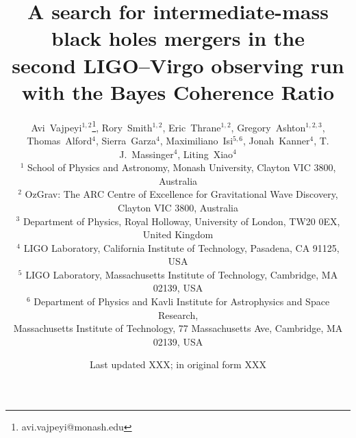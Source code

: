 \newcommand{\SPA}{School of Physics and Astronomy, Monash University, Clayton VIC 3800, Australia}
\newcommand{\OzGravMonash}{OzGrav: The ARC Centre of Excellence for Gravitational Wave Discovery, Clayton VIC 3800, Australia}
\newcommand{\CIT}{LIGO Laboratory, California Institute of Technology, Pasadena, CA 91125, USA}
\newcommand{\MIT}{LIGO Laboratory, Massachusetts Institute of Technology, Cambridge, MA 02139, USA}
\newcommand{\Kavli}{Department of Physics and Kavli Institute for Astrophysics and Space Research,\\ Massachusetts Institute of Technology, 77 Massachusetts Ave, Cambridge, MA 02139, USA}
\newcommand{\Royal}{Department of Physics, Royal Holloway, University of London, TW20 0EX, United Kingdom}





\title[An IMBH search in O2 using the BCR]{A search for intermediate-mass black holes mergers in the \\second LIGO--Virgo observing run with the Bayes Coherence Ratio}



\author[Vajpeyi et al.]{Avi~Vajpeyi$^{1,2}$\thanks{avi.vajpeyi@monash.edu},
    Rory~Smith$^{1,2}$,
    Eric~Thrane$^{1,2}$,
    Gregory~Ashton$^{1,2,3}$,
    Thomas~Alford$^{4}$,
    \newauthor
    Sierra~Garza$^{4}$,
    Maximiliano~Isi$^{5,6}$,
    Jonah~Kanner$^{4}$,
    T. J.~Massinger$^{4}$,
    Liting~Xiao$^{4}$
\\
$^{1}$ \SPA \\
$^{2}$ \OzGravMonash \\
$^{3}$ \Royal \\
$^{4}$ \CIT \\
$^{5}$ \MIT \\
$^{6}$ \Kavli 
}

\date{Last updated XXX; in original form XXX}


